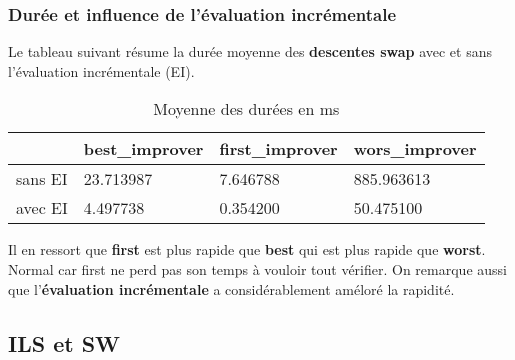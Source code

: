 \subsubsection{Durée et influence de l'évaluation incrémentale}
Le tableau suivant résume la durée moyenne des \textbf{descentes swap} avec et sans l'évaluation incrémentale (EI).
\begin{table}[ht]
	\centering
	\caption{Moyenne des durées en ms}
	\begin{tabular}[t]
		{m{}m{}m{}m{} }
		\toprule
		&best\_improver&	first\_improver&	wors\_improver\\
		\midrule
		sans EI &		23.713987&	7.646788&	885.963613\\
		avec EI &		4.497738& 0.354200 &	50.475100\\
		
		\bottomrule
	\end{tabular}
\end{table}

Il en ressort que \textbf{first} est plus rapide que \textbf{best} qui est plus rapide que \textbf{worst}. Normal car first ne perd pas son temps à vouloir tout vérifier.
On remarque aussi que l'\textbf{évaluation incrémentale} a considérablement améloré la rapidité. 


\subsection{ILS et SW}

